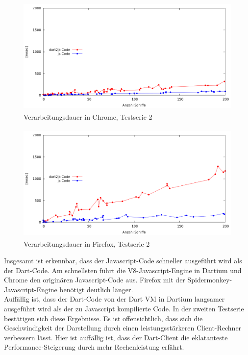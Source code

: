 \begin {figure}[H]
\begin{center}
  \includegraphics[height=2.3in]{images/ChromeOnMac.png}
\end{center}
 \caption{Verarbeitungsdauer in Chrome, Testserie 2}
\end {figure}


\begin {figure}[H]
\begin{center}
  \includegraphics[height=2.3in]{images/FirefoxOnMac.png}
\end{center}
 \caption{Verarbeitungsdauer in Firefox, Testserie 2}
\end {figure}

Insgesamt ist erkennbar, dass der Javascript-Code schneller ausgeführt wird als der Dart-Code. Am schnellsten führt die V8-Javascript-Engine in Dartium und Chrome den originären Javascript-Code aus. Firefox mit der Spidermonkey-Javascript-Engine benötigt deutlich länger.\\ Auffällig ist, dass der Dart-Code von der Dart VM in Dartium langsamer ausgeführt wird als der zu Javascript kompilierte Code.
In der zweiten Testserie bestätigen sich diese Ergebnisse. Es ist offensichtlich, dass sich die Geschwindigkeit der Darstellung durch einen leistungsstärkeren Client-Rechner verbessern lässt. Hier ist auffällig ist, dass der Dart-Client die eklatanteste Performance-Steigerung durch mehr Rechenleistung erfährt.

